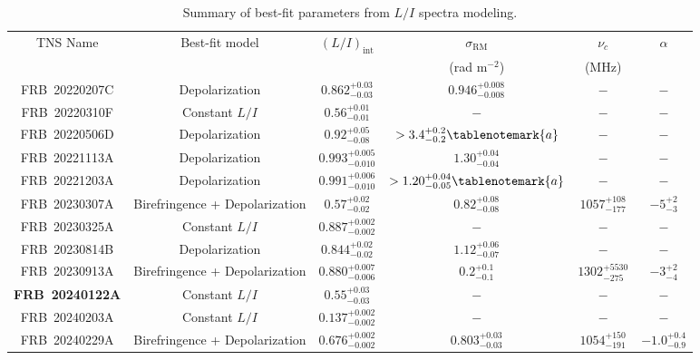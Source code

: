 \documentclass[twocolumn, linenumbers]{aastex701}
\newcommand{\newchange}[1]{{\color{red}\textbf{#1}}}
\begin{document}
\setlength{\tabcolsep}{12.6pt}
\setlength\extrarowheight{2pt}
\setlength{\LTcapwidth}{1.0\textwidth}
\begin{table}[t!]
\begin{center}
\caption{Summary of best-fit parameters from $L/I$ spectra modeling.} \label{tb:model_params}
\begin{tabular}{cccccc}
\hline
\hline
TNS Name & Best-fit model & $(L/I)_\mathrm{int}$ & $\sigma_\mathrm{RM}$ & $\nu_c$ & $\alpha$\\
 &  &  & (rad m$^{-2}$) & (MHz) & \\
\hline
FRB~20220207C & Depolarization & $0.862^{+0.03}_{-0.03}$ & $0.946^{+0.008}_{-0.008}$ & $-$ & $-$\\
FRB~20220310F & Constant $L/I$ & $0.56^{+0.01}_{-0.01}$ & $-$ & $-$ & $-$\\
FRB~20220506D & Depolarization & $0.92^{+0.05}_{-0.08}$ & $>3.4^{+0.2}_{-0.2}\tablenotemark{a}$ & $-$ & $-$\\
FRB~20221113A & Depolarization & $0.993^{+0.005}_{-0.010}$ & $1.30^{+0.04}_{-0.04}$ & $-$ & $-$\\
FRB~20221203A & Depolarization & $0.991^{+0.006}_{-0.010}$ & $>1.20^{+0.04}_{-0.05}\tablenotemark{a}$ & $-$ & $-$\\
FRB~20230307A & Birefringence + Depolarization & $0.57^{+0.02}_{-0.02}$ & $0.82^{+0.08}_{-0.08}$ & $1057^{+108}_{-177}$ & $-5^{+2}_{-3}$\\
FRB~20230325A & Constant $L/I$ & $0.887^{+0.002}_{-0.002}$ & $-$ & $-$ & $-$\\
FRB~20230814B & Depolarization & $0.844^{+0.02}_{-0.02}$ & $1.12^{+0.06}_{-0.07}$ & $-$ & $-$\\
FRB~20230913A & Birefringence + Depolarization & $0.880^{+0.007}_{-0.006}$ & $0.2^{+0.1}_{-0.1}$ & $1302^{+5530}_{-275}$ & $-3^{+2}_{-4}$\\
\newchange{FRB~20240122A} & Constant $L/I$ & $0.55^{+0.03}_{-0.03}$ & $-$ & $-$ & $-$\\
FRB~20240203A & Constant $L/I$ & $0.137^{+0.002}_{-0.002}$ & $-$ & $-$ & $-$\\
FRB~20240229A & Birefringence + Depolarization & $0.676^{+0.002}_{-0.002}$ & $0.803^{+0.03}_{-0.03}$ & $1054^{+150}_{-191}$ & $-1.0^{+0.4}_{-0.9}$\\
\hline
\hline
\end{tabular}
\end{center}
\end{table}
\end{document}
